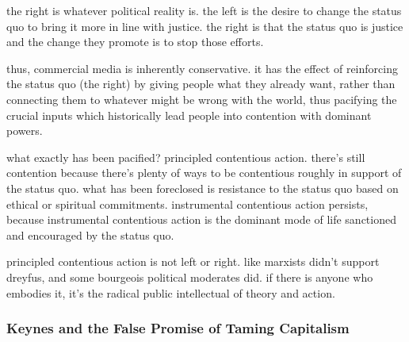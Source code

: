 \documentclass[12pt,book]{article}
\begin{document}
the right is whatever political reality is. the left is the desire to
change the status quo to bring it more in line with justice. the right
is that the status quo is justice and the change they promote is to stop
those efforts.

thus, commercial media is inherently conservative. it has the effect of
reinforcing the status quo (the right) by giving people what they
already want, rather than connecting them to whatever might be wrong
with the world, thus pacifying the crucial inputs which historically
lead people into contention with dominant powers.

what exactly has been pacified? principled contentious action. there's
still contention because there's plenty of ways to be contentious
roughly in support of the status quo. what has been foreclosed is
resistance to the status quo based on ethical or spiritual commitments.
instrumental contentious action persists, because instrumental
contentious action is the dominant mode of life sanctioned and
encouraged by the status quo.

principled contentious action is not left or right. like marxists didn't
support dreyfus, and some bourgeois political moderates did. if there is
anyone who embodies it, it's the radical public intellectual of theory
and action.

\subsubsection{Keynes and the False Promise of Taming
Capitalism}\label{keynes-and-the-false-promise-of-taming-capitalism}
\end{document}
